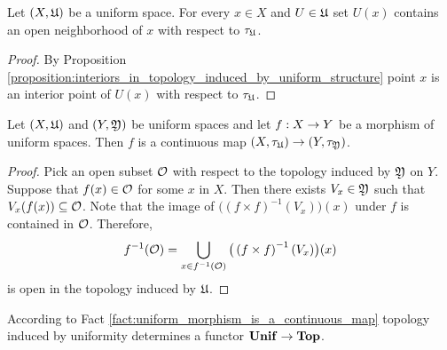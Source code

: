 \begin{corollary}\label{corollary:each_ball_is_an_open_neighborhood_with_respect_to_topology_induced_by_uniformity}
Let $(X,{\mathfrak U})$ be a uniform space. For every $x \in X$ and $U \in {\mathfrak U}$ set $U(x)$ contains an open neighborhood of $x$ with respect to $\tau_{{\mathfrak U}}$.
\end{corollary}
\begin{proof}
By Proposition \ref{proposition:interiors_in_topology_induced_by_uniform_structure} point $x$ is an interior point of $U(x)$ with respect to $\tau_{{\mathfrak U}}$.
\end{proof}

\begin{fact}\label{fact:uniform_morphism_is_a_continuous_map}
Let $(X,{\mathfrak U})$ and $(Y,{\mathfrak Y})$ be uniform spaces and let $f:X\rightarrow Y$ be a morphism of uniform spaces. Then $f$ is a continuous map $\left(X,\tau_{{\mathfrak U}}\right)\rightarrow \left(Y,\tau_{{\mathfrak Y}}\right)$.
\end{fact}
\begin{proof}
Pick an open subset ${\mathcal O}$ with respect to the topology induced by ${\mathfrak Y}$ on $Y$. Suppose that $f(x) \in {\mathcal O}$ for some $x$ in $X$. Then there exists $V_x \in {\mathfrak Y}$ such that $V_x(f(x))\subseteq {\mathcal O}$. Note that the image of $\big(\left(f\times f\right)^{-1}(V_x)\big)(x)$ under $f$ is contained in ${\mathcal O}$. Therefore,
$$f^{-1}({\mathcal O}) = \bigcup_{x\in f^{-1}({\mathcal O})}\big(\left(f\times f\right)^{-1}(V_x)\big)(x)$$
is open in the topology induced by ${\mathfrak U}$.
\end{proof}

\begin{remark}\label{remark:functor_of_topology_induced_by_uniform_structure}
According to Fact \ref{fact:uniform_morphism_is_a_continuous_map} topology induced by uniformity determines a functor $\mathbf{Unif} \rightarrow \mathbf{Top}$.
\end{remark}

